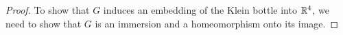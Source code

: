 \begin{proof}




To show that $G$ induces an embedding of the Klein bottle into ${\mathbb R}^4$, we need to show that $G$ is an immersion and a homeomorphism onto its image.


\end{proof}
